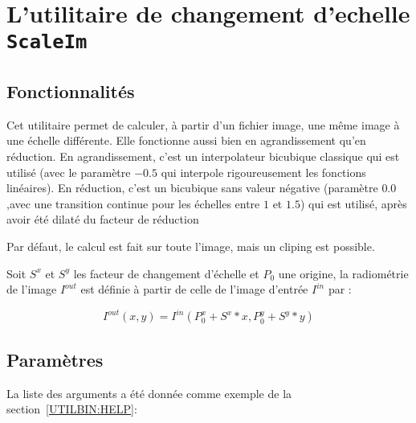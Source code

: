 \section{L'utilitaire  de changement d'echelle {\tt ScaleIm}}

\subsection{Fonctionnalit\'es}

Cet utilitaire permet de calculer, \`a partir d'un fichier image,
une m\^eme image \`a une \'echelle diff\'erente.  Elle fonctionne
aussi bien en agrandissement qu'en r\'eduction. En agrandissement,
c'est un interpolateur bicubique classique qui est utilis\'e
(avec le param\`etre $-0.5$ qui interpole rigoureusement les
fonctions lin\'eaires). En r\'eduction, c'est un bicubique 
sans valeur n\'egative (param\`etre $0.0$,avec une transition
continue pour les \'echelles entre $1$ et $1.5$) qui est utilis\'e,
apr\`es avoir \'et\'e  dilat\'e du facteur de r\'eduction

Par d\'efaut, le calcul est fait sur toute l'image, mais un
cliping est possible.

Soit $S^x$ et $S^y$ les facteur de changement d'\'echelle et
$P_0$ une origine, la radiom\'etrie de  l'image $I^{out}$ est
d\'efinie \`a partir de celle de l'image d'entr\'ee $I^{in}$
par :

\begin{equation}
   I^{out}(x,y) = I^{in}(P_0^x + S^x * x,P_0^y + S^y * y)
   \label{EQ:SCALE:IM}
\end{equation}

\subsection{Param\`etres}

La liste des arguments a \'et\'e donn\'ee comme exemple de la
section~\ref{UTILBIN:HELP}:

